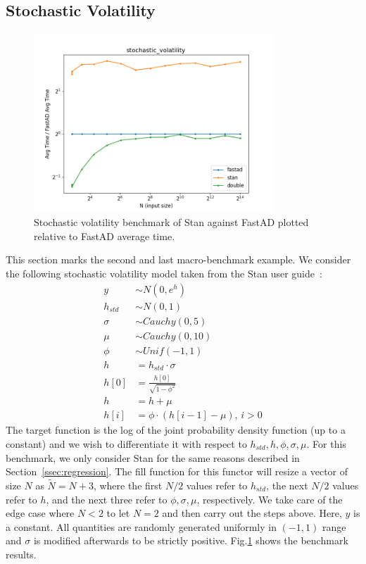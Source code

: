 \subsection{Stochastic Volatility}\label{ssec:stochastic_volatility}

\begin{figure}[t]
    \centering
    \includegraphics[width=0.8\textwidth]{figs/stochastic_volatility_fig.png}
    \caption{%
        Stochastic volatility benchmark of Stan against FastAD 
        plotted relative to FastAD average time.
    }\label{fig:stochastic_volatility}
\end{figure}

This section marks the second and last macro-benchmark example.
We consider the following stochastic volatility model 
taken from the Stan user guide~\cite{stan-rm:2018}:
\begin{align*}
    y &\sim N(0, e^{h}) \\
    h_{std} &\sim N(0, 1) \\
    \sigma &\sim Cauchy(0,5) \\
    \mu &\sim Cauchy(0,10) \\
    \phi &\sim Unif(-1, 1) \\
    h &= h_{std} \cdot \sigma \\
    h[0] &= \frac{h[0]}{\sqrt{1 - \phi^2}} \\
    h &= h + \mu \\
    h[i] &= \phi \cdot (h[i-1] - \mu),\, i > 0
\end{align*}
The target function is the log of the joint probability density function (up to a constant)
and we wish to differentiate it with respect to $h_{std}, h, \phi, \sigma, \mu$.
For this benchmark, we only consider Stan for the same reasons described in Section~\ref{ssec:regression}.
The fill function for this functor will resize a vector of size $N$ as $\tilde{N} = N + 3$,
where the first $N/2$ values refer to $h_{std}$,
the next $N/2$ values refer to $h$,
and the next three refer to $\phi, \sigma, \mu$, respectively.
We take care of the edge case where $N < 2$ to let $N = 2$ and then carry out the steps above.
Here, $y$ is a constant.
All quantities are randomly generated uniformly in $(-1,1)$ range
and $\sigma$ is modified afterwards to be strictly positive.
Fig.\ref{fig:stochastic_volatility} shows the benchmark results.

